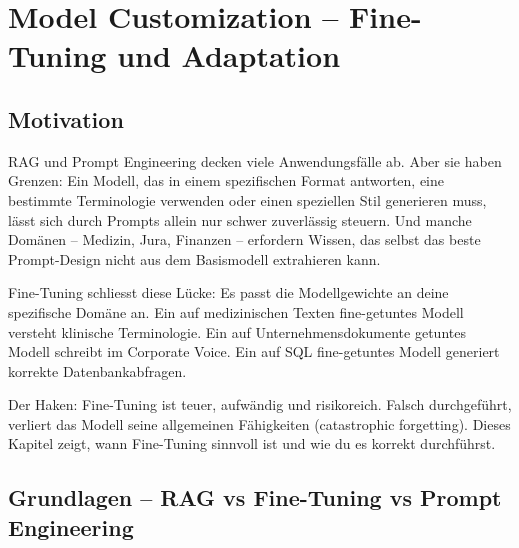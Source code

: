 \chapter{Model Customization -- Fine-Tuning und Adaptation}
\label{chap:finetuning}


\section{Motivation}

RAG und Prompt Engineering decken viele Anwendungsfälle ab. Aber sie haben Grenzen: Ein Modell, das in einem spezifischen Format antworten, eine bestimmte Terminologie verwenden oder einen speziellen Stil generieren muss, lässt sich durch Prompts allein nur schwer zuverlässig steuern. Und manche Domänen -- Medizin, Jura, Finanzen -- erfordern Wissen, das selbst das beste Prompt-Design nicht aus dem Basismodell extrahieren kann.

Fine-Tuning schliesst diese Lücke: Es passt die Modellgewichte an deine spezifische Domäne an. Ein auf medizinischen Texten fine-getuntes Modell versteht klinische Terminologie. Ein auf Unternehmensdokumente getuntes Modell schreibt im Corporate Voice. Ein auf SQL fine-getuntes Modell generiert korrekte Datenbankabfragen.

Der Haken: Fine-Tuning ist teuer, aufwändig und risikoreich. Falsch durchgeführt, verliert das Modell seine allgemeinen Fähigkeiten (catastrophic forgetting). Dieses Kapitel zeigt, wann Fine-Tuning sinnvoll ist und wie du es korrekt durchführst.

\section{Grundlagen -- RAG vs Fine-Tuning vs Prompt Engineering}

